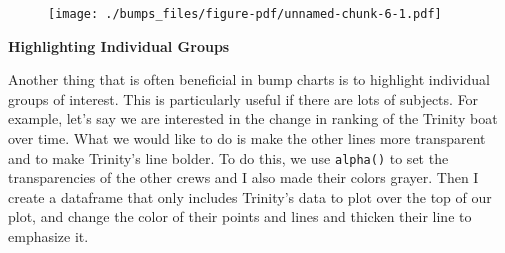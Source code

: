 \documentclass[
  letterpaper,
  DIV=11,
  numbers=noendperiod]{scrreprt}
\newenvironment{Shaded}{\begin{snugshade}}{\end{snugshade}}
\newcommand{\AttributeTok}[1]{\textcolor[rgb]{0.40,0.45,0.13}{#1}}
\newcommand{\DecValTok}[1]{\textcolor[rgb]{0.68,0.00,0.00}{#1}}
\newcommand{\FloatTok}[1]{\textcolor[rgb]{0.68,0.00,0.00}{#1}}
\newcommand{\FunctionTok}[1]{\textcolor[rgb]{0.28,0.35,0.67}{#1}}
\newcommand{\NormalTok}[1]{\textcolor[rgb]{0.00,0.23,0.31}{#1}}
\newcommand{\SpecialCharTok}[1]{\textcolor[rgb]{0.37,0.37,0.37}{#1}}
\newcommand{\StringTok}[1]{\textcolor[rgb]{0.13,0.47,0.30}{#1}}
\begin{document}
\begin{Shaded}
\end{Shaded}

\begin{figure}[H]

{\centering \texttt{[image: ./bumps\_files/figure-pdf/unnamed-chunk-6-1.pdf]}

}

\end{figure}

\textbf{Highlighting Individual Groups}

Another thing that is often beneficial in bump charts is to highlight
individual groups of interest. This is particularly useful if there are
lots of subjects. For example, let's say we are interested in the change
in ranking of the Trinity boat over time. What we would like to do is
make the other lines more transparent and to make Trinity's line bolder.
To do this, we use \texttt{alpha()} to set the transparencies of the
other crews and I also made their colors grayer. Then I create a
dataframe that only includes Trinity's data to plot over the top of our
plot, and change the color of their points and lines and thicken their
line to emphasize it.
\end{document}
